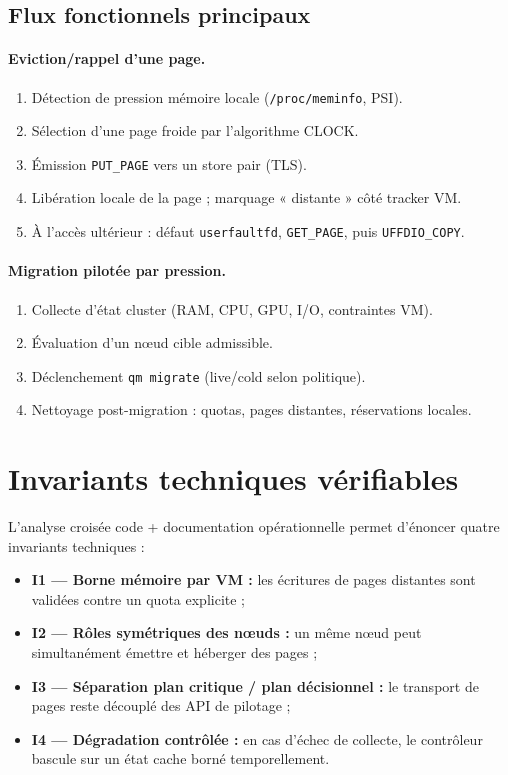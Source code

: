 \subsection{Flux fonctionnels principaux}

\paragraph{Eviction/rappel d’une page.}
\begin{enumerate}
    \item Détection de pression mémoire locale (\texttt{/proc/meminfo}, PSI).
    \item Sélection d’une page froide par l’algorithme CLOCK.
    \item Émission \texttt{PUT\_PAGE} vers un store pair (TLS).
    \item Libération locale de la page ; marquage « distante » côté tracker VM.
    \item À l’accès ultérieur : défaut \texttt{userfaultfd}, \texttt{GET\_PAGE}, puis \texttt{UFFDIO\_COPY}.
\end{enumerate}

\paragraph{Migration pilotée par pression.}
\begin{enumerate}
    \item Collecte d’état cluster (RAM, CPU, GPU, I/O, contraintes VM).
    \item Évaluation d’un nœud cible admissible.
    \item Déclenchement \texttt{qm migrate} (live/cold selon politique).
    \item Nettoyage post-migration : quotas, pages distantes, réservations locales.
\end{enumerate}

\section{Invariants techniques vérifiables}
\label{sec:invariants-verifiables}

L’analyse croisée code + documentation opérationnelle permet d’énoncer quatre invariants techniques :
\begin{itemize}
    \item \textbf{I1 — Borne mémoire par VM :} les écritures de pages distantes sont validées contre un quota explicite ;
    \item \textbf{I2 — Rôles symétriques des nœuds :} un même nœud peut simultanément émettre et héberger des pages ;
    \item \textbf{I3 — Séparation plan critique / plan décisionnel :} le transport de pages reste découplé des API de pilotage ;
    \item \textbf{I4 — Dégradation contrôlée :} en cas d’échec de collecte, le contrôleur bascule sur un état cache borné temporellement.
\end{itemize}

